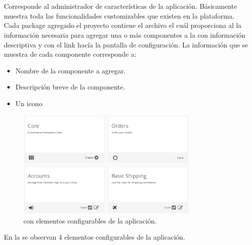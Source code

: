 \section{\dashboardEF}
	Corresponde al administrador de características de la aplicación. Básicamente muestra toda las funcionalidades customizables que existen en la plataforma.
	Cada package agregado el proyecto contiene el archivo \packageDescriptionFILE el cuál proporciona al \dashboardEF la información necesaria para agregar una o más componentes a la \uiSiglaAS con información descriptiva y con el link hacía la pantalla de configuración.
	La información que se muestra de cada componente corresponde a:

	\begin{itemize}
		\item Nombre de la componente a agregar.
		\item Descripción breve de la componente.
		\item Un icono 
	\end{itemize} 


	\begin{figure}[!h]
		\centering
		\includegraphics[width=0.8\textwidth]{figuras/dashboard/dashboard_menu.png}
		\caption{\dashboardEF con elementos configurables de la aplicación.}
		\label{figure:dashboard:dashboard_menu}
	\end{figure}

	En la  se observan 4 elementos configurables de la aplicación. 

	

	

	

	